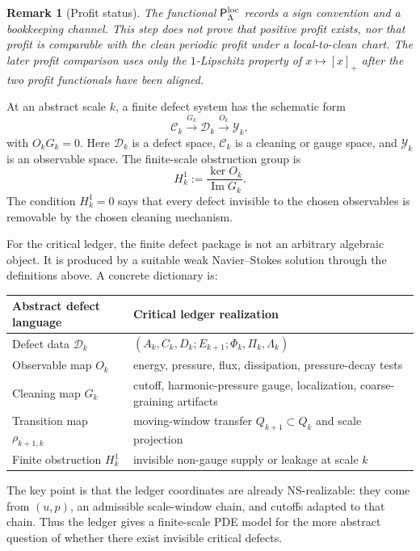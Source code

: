\documentclass[11pt]{article}
\numberwithin{equation}{section}
\newtheorem{remark}[theorem]{Remark}
\newcommand{\calC}{\mathcal C}
\newcommand{\calD}{\mathcal D}
\newcommand{\calY}{\mathcal Y}
\newcommand{\Image}{\operatorname{Im}}
\begin{document}
\begin{remark}[Profit status]
The functional \(\mathsf P_\Lambda^{\rm loc}\) records a sign convention
and a bookkeeping channel.  This step does not prove that positive profit
exists, nor that profit is comparable with the clean periodic profit under
a local-to-clean chart.  The later profit comparison uses only the
\(1\)-Lipschitz property of \(x\mapsto[x]_+\) after the two profit
functionals have been aligned.
\end{remark}

At an abstract scale $k$, a finite defect system has the schematic form
\begin{equation}\label{eq:defect-complex}
    \calC_k \xrightarrow{G_k} \calD_k \xrightarrow{O_k} \calY_k,
\end{equation}
with $O_kG_k=0$.  Here $\calD_k$ is a defect space, $\calC_k$ is a cleaning or gauge space, and $\calY_k$ is an observable space.  The finite-scale obstruction group is
\begin{equation}\label{eq:H1k}
    H_k^1:=\frac{\ker O_k}{\Image G_k}.
\end{equation}
The condition $H_k^1=0$ says that every defect invisible to the chosen observables is removable by the chosen cleaning mechanism.

For the critical ledger, the finite defect package is not an arbitrary algebraic object.  It is produced by a suitable weak Navier--Stokes solution through the definitions above.  A concrete dictionary is:
\begin{center}
\begin{tabular}{@{}ll@{}}
\toprule
Abstract defect language & Critical ledger realization \\
\midrule
Defect data $\calD_k$ & $(A_k,C_k,D_k;E_{k+1};\Phi_k,\Pi_k,\Lambda_k)$ \\
Observable map $O_k$ & energy, pressure, flux, dissipation, pressure-decay tests \\
Cleaning map $G_k$ & cutoff, harmonic-pressure gauge, localization, coarse-graining artifacts \\
Transition map $\rho_{k+1,k}$ & moving-window transfer $Q_{k+1}\subset Q_k$ and scale projection \\
Finite obstruction $H_k^1$ & invisible non-gauge supply or leakage at scale $k$ \\
\bottomrule
\end{tabular}
\end{center}

The key point is that the ledger coordinates are already NS-realizable: they come from $(u,p)$, an admissible scale-window chain, and cutoffs adapted to that chain.  Thus the ledger gives a finite-scale PDE model for the more abstract question of whether there exist invisible critical defects.
\end{document}

